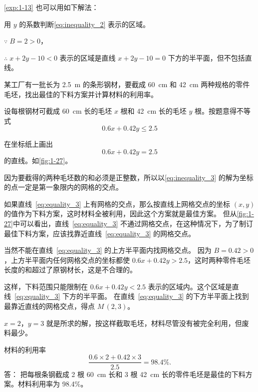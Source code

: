 \cref{exp:1-13} 也可以用如下解法：

\begin{solution}
  用 $y$ 的系数判断\cref{eq:inequality_2} 表示的区域。

  $\because \; B=2>0$，
  
  $\therefore\; x+2y-10<0$ 表示的区域是直线 $x+2y-10=0$ 下方的半平面，但不包括直线。
\end{solution}

\begin{example}
  某工厂有一批长为 \qty{2.5}{m} 的条形钢材，要截成 \qty{60}{cm} 和 \qty{42}{cm} 两种规格的零件毛坯，找出最佳的下料方案并计算材料的利用率。
\end{example}

\begin{solution}
  设每根钢材可截成 \qty{60}{cm} 长的毛坯 $x$ 根和 \qty{42}{cm} 长的毛坯 $y$ 根。按题意得不等式
  \begin{equation}
    \label{eq:inequality_3}
    0.6x+0.42y\leqslant 2.5
  \end{equation}

  在坐标纸上画出
  \begin{equation}
    \label{eq:equality_3}
    0.6x+0.42y= 2.5
  \end{equation}
  的直线。如\cref{fig:1-27}。

  因为要截得的两种毛坯数的和必须是正整数，所以以\cref{eq:inequality_3} 的解为坐标的点一定是第一象限内的网格的交点。

如果直线~\eqref{eq:equality_3} 上有网格的交点，那么按直线上网格交点的坐标 $(x,y)$ 的值作为下料方案，这时材料全被利用，因此这个方案就是最佳方案。
但从\cref{fig:1-27}中可以看出，直线~\eqref{eq:equality_3} 不通过网格交点，在这种情况下，为了制订最佳下料方案，应该找靠近直线~\eqref{eq:equality_3} 的网格交点。

当然不能在直线~\eqref{eq:equality_3} 的上方半平面内找网格交点。
因为 $B=0.42>0$，上方半平面内任何网格交点的坐标都使 $0.6x+0.42y>2.5$，这时两种零件毛坯长度的和超过了原钢材长，这是不合理的。

这样，下料范围只能限制在 $0.6x+0.42y<2.5$ 表示的区域内。这个区域是直线~\eqref{eq:equality_3} 下方的半平面。
在直线~\eqref{eq:equality_3} 的下方半平面上找到最靠近直线的网格交点，得点 $M\,(2,3)$。

$x=2$，$y=3$ 就是所求的解，按这样截取毛坯，材料尽管没有被完全利用，但废料最少。

材料的利用率
\[ \frac{0.6 \times 2 + 0.42 \times 3}{2.5} =98.4\%.\]
答： 把每根条钢截成 2 根 \qty{60}{cm} 长和 3 根 \qty{42}{cm} 长的零件毛坯是最佳的下料方案。材料利用率为 98.4\%。
\end{solution}

